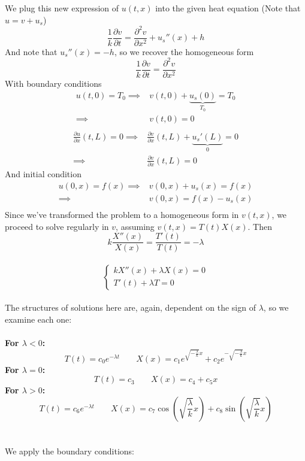 \documentclass[12pt]{article}
\begin{document}
{We plug this new expression of $u(t,x)$ into the given heat equation (Note that $u = v + u_s$)
$$\frac{1}{k} \frac{\partial v}{\partial t} = \frac{\partial^2 v}{\partial x^2} + u_s''(x) + h$$
And note that $u_s''(x) = -h$, so we recover the homogeneous form
$$\frac{1}{k} \frac{\partial v}{\partial t} = \frac{\partial^2 v}{\partial x^2}$$
With boundary conditions 
\begin{align*}
u(t,0) = T_0 \implies& v(t,0) + \underbrace{u_s(0)}_{T_0} = T_0 \\
\implies& v(t,0) = 0 \\
\end{align*}
\begin{align*}
\frac{\partial u}{\partial x} (t,L) = 0 \implies& \frac{\partial v}{\partial x}(t,L) + \underbrace{u_s'(L)}_{0} = 0\\
\implies& \frac{\partial v}{\partial x}(t,L) = 0
\end{align*}
And initial condition
\begin{align*}
u(0,x) = f(x) \implies& v(0,x) + u_s(x) = f(x) \\
\implies& v(0,x) = f(x) - u_s(x) \\
\end{align*}
Since we've transformed the problem to a homogeneous form in $v(t,x)$, we proceed to solve regularly in $v$, assuming $v(t,x) = T(t)X(x)$. Then $$k\frac{X''(x)}{X(x)} = \frac{T'(t)}{T(t)} = -\lambda$$ \\
$$\begin{cases}
kX''(x) + \lambda X(x) = 0 \\
T'(t) + \lambda T = 0
\end{cases}$$\\
The structures of solutions here are, again, dependent on the sign of $\lambda$, so we examine each one: \\ \\
\textbf{For $\lambda < 0$:} \\
$$T(t) = c_0 e^{-\lambda t} \;\;\;\;\;\;\; X(x) = c_1 e^{\sqrt{-\frac{\lambda}{k}} x} + c_2 e^{-\sqrt{-\frac{\lambda}{k}} x}$$
\textbf{For $\lambda = 0$:} \\
$$T(t) = c_3 \;\;\;\;\;\;\;  X(x) = c_4 + c_5x$$
\textbf{For $\lambda > 0$:} \\ 
$$T(t) = c_6 e^{-\lambda t} \;\;\;\;\;\;\; X(x) = c_7 \cos \left( \sqrt{\frac{\lambda}{k}} x \right) + c_8 \sin \left( \sqrt{\frac{\lambda}{k}} x \right)$$ \\ \\
We apply the boundary conditions: \\ \\
}
\end{document}
